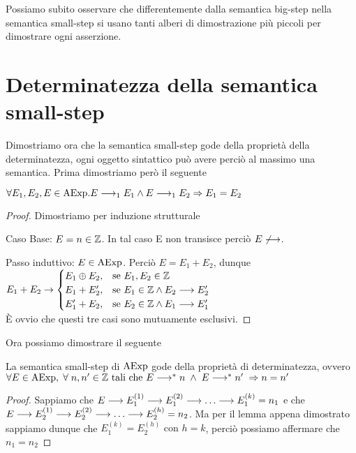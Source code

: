 Possiamo subito osservare che differentemente dalla semantica big-step
nella semantica small-step si usano tanti alberi di dimostrazione più piccoli per dimostrare
ogni asserzione. 

\section{Determinatezza della semantica small-step} 
Dimostriamo ora che la semantica small-step gode della proprietà della determinatezza, ogni oggetto sintattico può avere perciò al massimo una semantica. Prima dimostriamo però il seguente

\begin{teorema}
$\forall E_1, E_2, E \in \mathrm{AExp} . E \longrightarrow _1 E_1 \land E \longrightarrow _1 E_2 \Rightarrow E_1 = E_2 $
\end{teorema}

\begin{proof}
         Dimostriamo per induzione strutturale
  
Caso Base: $E = n \in \mathbb{Z}$.
In tal caso E non transisce perciò $E \not \longrightarrow$.
  
Passo induttivo: $E \in \mathrm{AExp}$.
Perciò $E = E_1 + E_2$, dunque\\
$E_1 + E_2 \rightarrow \begin{cases} E_1 \oplus E_2, & \text{se }E_1, E_2 \in \mathbb{Z} \\
E_1 + E_2', & \text{se }E_1 \in \mathbb{Z} \land E_2 \longrightarrow E_2' \\
E_1' + E_2, & \text{se }E_2 \in \mathbb{Z} \land E_1 \longrightarrow E_1' \end{cases}$\\

È ovvio che questi tre casi sono mutuamente esclusivi.
\end{proof}

Ora possiamo dimostrare il seguente

\begin{teorema}[Determinatezza]
La semantica small-step di $\mathrm{AExp}$ gode della proprietà di determinatezza, ovvero
$\forall E \in \mathrm{AExp}, \; \forall \; n, n' \in \mathbb{Z} \text{ tali che } E \longrightarrow ^* n \; \land \; E \longrightarrow ^* n' \; \Rightarrow n = n'$
\end{teorema}

\begin{proof}
Sappiamo che $E \ssarrow E_1^{(1)} \ssarrow E_1^{(2)} \ssarrow \dots \ssarrow E_1^{(k)} = n_1$ e che $E \ssarrow E_2^{(1)} \ssarrow E_2^{(2)} \ssarrow \dots \ssarrow E_2^{(h)} = n_2$.
Ma per il lemma appena dimostrato sappiamo dunque che $E_1^{(k)} = E_2^{(h)} \text{ con } h = k$, perciò possiamo affermare che $n_1 = n_2$
\end{proof}

